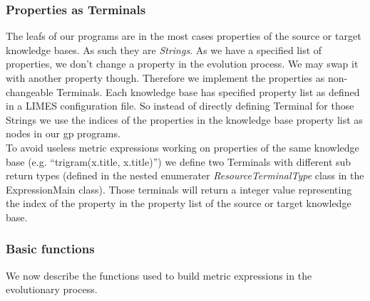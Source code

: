 \documentclass{article}%
\begin{document}
\subsubsection{Properties as Terminals}
The leafs of our programs are in the most cases properties of the source or target knowledge bases. As such they are \textit{Strings}. As we have a specified list of properties, we don't change a property in the evolution process. We may swap it with another property though. Therefore we implement the properties as non-changeable Terminals. Each knowledge base has specified property list as defined in a LIMES configuration file. So instead of directly defining Terminal for those Strings we use the indices of the properties in the knowledge base property list as nodes in our gp programs.\\
To avoid useless metric expressions working on properties of the same knowledge base (e.g. ``trigram(x.title, x.title)'') we define two Terminals with different sub return types (defined in the nested enumerater \textit{ResourceTerminalType} class in the ExpressionMain class). Those terminals will return a integer value representing the index of the property in the property list of the source or target knowledge base.

\subsubsection{Basic functions}
We now describe the functions used to build metric expressions in the evolutionary process.
\end{document}
